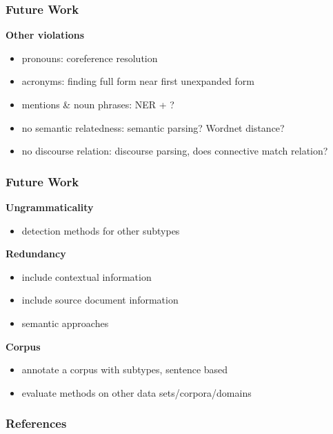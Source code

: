 \documentclass[table]{beamer}
\begin{document}
\begin{frame}
  \frametitle{Future Work}
  \textbf{Other violations}
  \begin{itemize}
    \item pronouns: coreference resolution
    \item acronyms: finding full form near first unexpanded form
    \item mentions \& noun phrases: NER + ?
    \item no semantic relatedness: semantic parsing? Wordnet distance?
    \item no discourse relation: discourse parsing, does connective match relation?
  \end{itemize}
\end{frame}

\begin{frame}
  \frametitle{Future Work}
  \textbf{Ungrammaticality}
  \begin{itemize}
    \item detection methods for other subtypes
  \end{itemize}\pause
  \vspace{0.5cm}
  \textbf{Redundancy}
  \begin{itemize}
    \item include contextual information
    \item include source document information
    \item semantic approaches
  \end{itemize}\pause
  \vspace{0.5cm}
  \textbf{Corpus}
  \begin{itemize}
    \item annotate a corpus with subtypes, sentence based
    \item evaluate methods on other data sets/corpora/domains
  \end{itemize}
\end{frame}

\begin{frame}
  \frametitle{References}
  
  \footnotesize
\end{frame}
\end{document}
